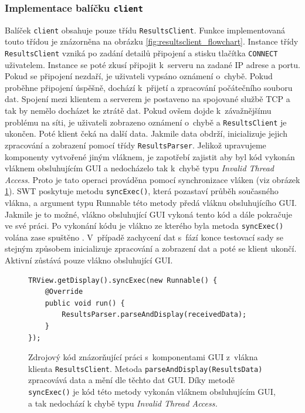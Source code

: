       \subsubsection{Implementace balíčku \texttt{client}}
      Balíček \texttt{client} obsahuje pouze třídu \texttt{ResultsClient}. Funkce implementovaná touto třídou je znázorněna na obrázku \ref{fig:resultsclient_flowchart}. Instance třídy \texttt{ResultsClient} vzniká po zadání detailů připojení a stisku tlačítka \texttt{CONNECT} uživatelem. Instance se poté zkusí připojit k~serveru na zadané IP adrese a portu. Pokud se připojení nezdaří, je uživateli vypsáno oznámení o~chybě. Pokud proběhne připojení úspěšně, dochází k~přijetí a zpracování počátečního souboru dat. Spojení mezi klientem a serverem je postaveno na spojované službě TCP a tak by nemělo docházet ke ztrátě dat. Pokud ovšem dojde k~závažnějšímu problému na síti, je uživateli zobrazeno oznámení o~chybě a \texttt{ResultsClient} je ukončen. Poté klient čeká na další data. Jakmile data obdrží, inicializuje jejich zpracování a zobrazení pomocí třídy \texttt{ResultsParser}. Jelikož upravujeme komponenty vytvořené jiným vláknem, je zapotřebí zajistit aby byl kód vykonán vláknem obsluhujícím GUI a nedocházelo tak k~chybě typu \emph{Invalid Thread Access}. Proto je tato operaci prováděna pomocí synchronizace vláken (viz obrázek \ref{code:syncExec}). SWT poskytuje metodu \texttt{syncExec()}, která pozastaví průběh současného vlákna, a argument typu Runnable této metody předá vláknu obsluhujícího GUI. Jakmile je to možné, vlákno obsluhující GUI vykoná tento kód a dále pokračuje ve své práci. Po vykonání kódu je vlákno ze kterého byla metoda \texttt{syncExec()} volána zase spuštěno \cite{codeaffine-asyncexec}. V~případě zachycení dat s~fází konce testovací sady se stejným způsobem inicializuje zpracování a zobrazení dat a poté se klient ukončí. Aktivní zůstává pouze vlákno obsluhující GUI.

      	\lstset{language=java}
	\begin{figure}
	  \begin{lstlisting}[frame=single]
TRView.getDisplay().syncExec(new Runnable() {
	@Override
	public void run() {
		ResultsParser.parseAndDisplay(receivedData);
	}
});
	  \end{lstlisting}
	  \caption{Zdrojový kód znázorňující práci s~komponentami GUI z~vlákna klienta \texttt{ResultsClient}. Metoda \texttt{parseAndDisplay(ResultsData)} zpracovává data a mění dle těchto dat GUI. Díky metodě \texttt{syncExec()} je kód této metody vykonán vláknem obsluhujícím GUI, a tak nedochází k chybě typu \emph{Invalid Thread Access.}}
	  \label{code:syncExec}
	\end{figure}


